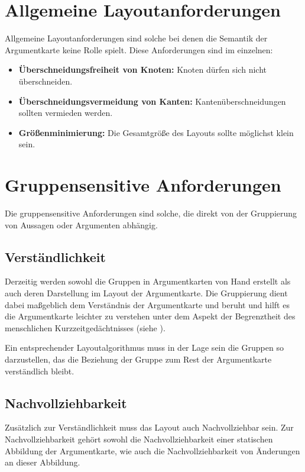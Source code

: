 \section{Allgemeine Layoutanforderungen}
Allgemeine Layoutanforderungen sind solche bei denen die Semantik der Argumentkarte keine Rolle spielt.
Diese Anforderungen sind im einzelnen:

\begin{itemize}
\item {\normalfont \bfseries{Überschneidungsfreiheit von Knoten:}} \newline Knoten dürfen sich nicht überschneiden.
\item {\normalfont \bfseries{Überschneidungsvermeidung von Kanten:}}  \newline Kantenüberschneidungen sollten vermieden werden.
\item {\normalfont \bfseries{Größenminimierung:}} \newline Die Gesamtgröße des Layouts sollte möglichst klein sein.
\end{itemize}

\section{Gruppensensitive Anforderungen}
Die gruppensensitive Anforderungen sind solche, die direkt von der Gruppierung von Aussagen oder Argumenten abhängig.

\subsection{Verständlichkeit}
Derzeitig werden sowohl die Gruppen in Argumentkarten von Hand erstellt als auch deren Darstellung im Layout der Argumentkarte. Die Gruppierung dient dabei maßgeblich dem Verständnis der Argumentkarte und beruht und hilft es die Argumentkarte leichter zu verstehen unter dem Aspekt der Begrenztheit des menschlichen Kurzzeitgedächtnisses (siehe \cite{miller1956magical, BBS:84441}).

Ein entsprechender Layoutalgorithmus muss in der Lage sein die Gruppen so darzustellen, das die Beziehung der Gruppe zum Rest der Argumentkarte verständlich bleibt.

\subsection{Nachvollziehbarkeit}
Zusätzlich zur Verständlichkeit muss das Layout auch Nachvollziehbar sein. Zur Nachvollziehbarkeit gehört sowohl die Nachvollziehbarkeit einer statischen Abbildung der Argumentkarte, wie auch die Nachvollziehbarkeit von Änderungen an dieser Abbildung.

